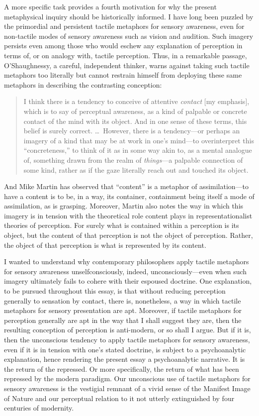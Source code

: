 A more specific task provides a fourth motivation for why the present metaphysical inquiry should be historically informed. I have long been puzzled by the primordial and persistent tactile metaphors for sensory awareness, even for non-tactile modes of sensory awareness such as vision and audition. Such imagery persists even among those who would eschew any explanation of perception in terms of, or on analogy with, tactile perception. Thus, in a remarkable passage, O'Shaughnessy, a careful, independent thinker, warns against taking such tactile metaphors too literally but cannot restrain himself from deploying these same metaphors in describing the contrasting conception:
\begin{quote}
	I think there is a tendency to conceive of attentive \emph{contact} [my emphasis], which is to say of perceptual awareness, as a kind of palpable or concrete contact of the mind with its object. And in one sense of these terms, this belief is surely correct. \ldots\ However, there is a tendency---or perhaps an imagery of a kind that may be at work in one's mind---to overinterpret this ``concreteness,'' to think of it as in some way akin to, as a mental analogue of, something drawn from the realm of \emph{things}---a palpable connection of some kind, rather as if the gaze literally reach out and touched its object. \citep[183]{OShaughnessy:2003eu}
\end{quote}
And Mike Martin has observed that ``content'' is a metaphor of assimilation---to have a content is to be, in a way, its container, containment being itself a mode of assimilation, as is grasping. Moreover, Martin also notes the way in which this imagery is in tension with the theoretical role content plays in representationalist theories of perception. For surely what is contained within a perception is its object, but the content of that perception is not the object of perception. Rather, the object of that perception is what is represented by its content.

I wanted to understand why contemporary philosophers apply tactile metaphors for sensory awareness unselfconsciously, indeed, unconsciously---even when such imagery ultimately fails to cohere with their espoused doctrine. One explanation, to be pursued throughout this essay, is that without reducing perception generally to sensation by contact, there is, nonetheless, a way in which tactile metaphors for sensory presentation are apt. Moreover, if tactile metaphors for perception generally are apt in the way that I shall suggest they are, then the resulting conception of perception is anti-modern, or so shall I argue. But if it is, then the unconscious tendency to apply tactile metaphors for sensory awareness, even if it is in tension with one's stated doctrine, is subject to a psychoanalytic explanation, hence rendering the present essay a psychoanalytic narrative. It is the return of the repressed. Or more specifically, the return of what has been repressed by the modern paradigm. Our unconscious use of tactile metaphors for sensory awareness is the vestigial remnant of a vivid sense of the Manifest Image of Nature and our perceptual relation to it not utterly extinguished by four centuries of modernity.

